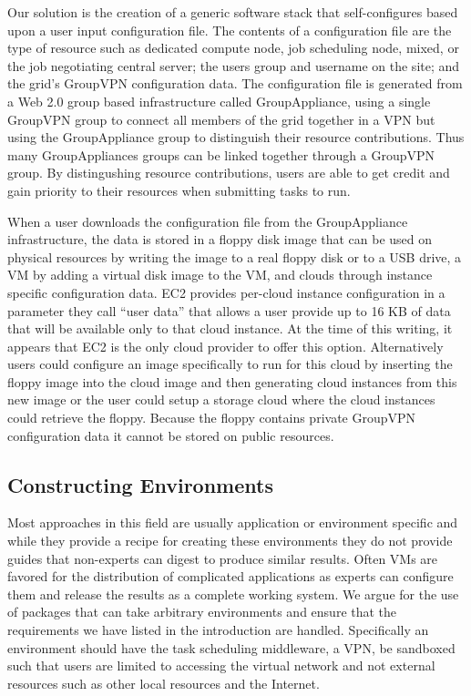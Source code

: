 \documentclass{sig-alternate}
\begin{document}
Our solution is the creation of a generic software stack that self-configures
based upon a user input configuration file.  The contents of a configuration
file are the type of resource such as dedicated compute node, job scheduling
node, mixed, or the job negotiating central server; the users group and
username on the site; and the grid's GroupVPN configuration data.  The configuration file is
generated from a Web 2.0 group based infrastructure called GroupAppliance, using
a single GroupVPN group to connect all members of the grid together in a VPN but
using the GroupAppliance group to distinguish their resource contributions.
Thus many GroupAppliances groups can be linked together through a GroupVPN
group.  By distingushing resource contributions, users are able to get credit
and gain priority to their resources when submitting tasks to run.

When a user downloads the configuration file from the GroupAppliance
infrastructure, the data is stored in a floppy disk image that can be used on
physical resources by writing the image to a real floppy disk or to a USB drive,
a VM by adding a virtual disk image to the VM, and clouds through instance
specific configuration data.  EC2 provides per-cloud instance configuration in a
parameter they call ``user data'' that allows a user provide up to 16 KB of data
that will be available only to that cloud instance.  At the time of this
writing, it appears that EC2 is the only cloud provider to offer this option.
Alternatively users could configure an image specifically to run for this
cloud by inserting the floppy image into the cloud image and then generating
cloud instances from this new image or the user could setup a storage cloud
where the cloud instances could retrieve the floppy.  Because the floppy
contains private GroupVPN configuration data it cannot be stored on public
resources.

\subsection{Constructing Environments}
Most approaches in this field are usually application or environment specific
and while they provide a recipe for creating these environments they do not
provide guides that non-experts can digest to produce similar results.  Often
VMs are favored for the distribution of complicated applications as experts can
configure them and release the results as a complete working system.  We argue
for the use of packages that can take arbitrary environments and ensure that
the requirements we have listed in the introduction are handled.  Specifically
an environment should have the task scheduling middleware, a VPN, be sandboxed
such that users are limited to accessing the virtual network and not external
resources such as other local resources and the Internet.
\end{document}
